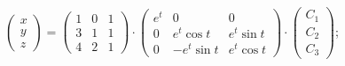 \begin{enumsolsfull}
		\item \( \begin{pmatrix} x \\ y \\ z \end{pmatrix} = \begin{pmatrix} 1 & 0 & 1 \\ 3 & 1 & 1 \\ 4 & 2 & 1 \end{pmatrix} \cdot \begin{pmatrix} e^{t} & 0 & 0 \\ 0 & e^{t} \cos{t} & e^{t} \sin{t} \\ 0 & -e^{t} \sin{t} & e^{t} \cos{t} \end{pmatrix} \cdot \begin{pmatrix} C_1 \\ C_2 \\ C_3 \end{pmatrix} \); %

\end{enumsolsfull}
